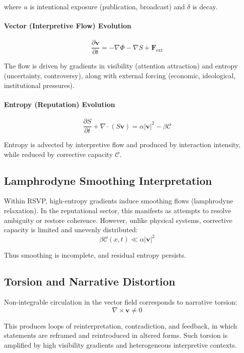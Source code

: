 \documentclass[12pt,a4paper]{article}
\begin{document}
where $u$ is intentional exposure (publication, broadcast) and $\delta$ is decay.

\paragraph{Vector (Interpretive Flow) Evolution}
\[
\frac{\partial \mathbf{v}}{\partial t}
=
- \nabla \Phi
- \nabla S
+ \mathbf{F}_{\text{ext}}
\]

The flow is driven by gradients in visibility (attention attraction) and entropy (uncertainty, controversy), along with external forcing (economic, ideological, institutional pressures).

\paragraph{Entropy (Reputation) Evolution}
\[
\frac{\partial S}{\partial t}
+ \nabla \cdot (S \mathbf{v})
=
\alpha |\mathbf{v}|^2
- \beta \mathcal{C}
\]

Entropy is advected by interpretive flow and produced by interaction intensity, while reduced by corrective capacity $\mathcal{C}$.

\subsection{Lamphrodyne Smoothing Interpretation}

Within RSVP, high-entropy gradients induce smoothing flows (lamphrodyne relaxation). In the reputational sector, this manifests as attempts to resolve ambiguity or restore coherence. However, unlike physical systems, corrective capacity is limited and unevenly distributed:
\[
\beta \mathcal{C}(x,t) \ll \alpha |\mathbf{v}|^2
\]

Thus smoothing is incomplete, and residual entropy persists.

\subsection{Torsion and Narrative Distortion}

Non-integrable circulation in the vector field corresponds to narrative torsion:
\[
\nabla \times \mathbf{v} \neq 0
\]

This produces loops of reinterpretation, contradiction, and feedback, in which statements are reframed and reintroduced in altered forms. Such torsion is amplified by high visibility gradients and heterogeneous interpretive contexts.
\end{document}
